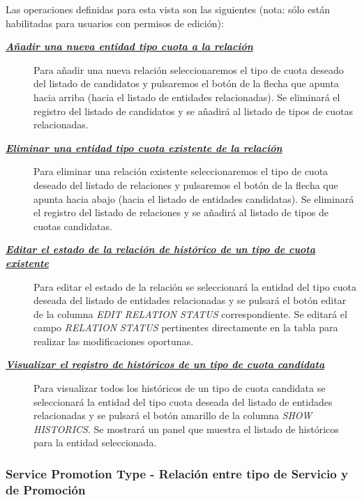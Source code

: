 Las operaciones definidas para esta vista son las siguientes (nota: sólo están habilitadas para usuarios con permisos de edición):
\begin{description}
\item[\underline{\textsl{\textbf{Añadir una nueva entidad tipo cuota a la relación}}}] Para añadir una nueva relación seleccionaremos el tipo de cuota deseado del listado de candidatos y pulsaremos el botón de la flecha que apunta hacia arriba (hacia el listado de entidades relacionadas). Se eliminará el registro del listado de candidatos y se añadirá al listado de tipos de cuotas relacionadas.

\item[\underline{\textsl{\textbf{Eliminar una entidad tipo cuota existente de la relación}}}] Para eliminar una relación existente seleccionaremos el tipo de cuota deseado del listado de relaciones y pulsaremos el botón de la flecha que apunta hacia abajo (hacia el listado de entidades candidatas). Se eliminará el registro del listado de relaciones y se añadirá al listado de tipos de cuotas candidatas.

\item[\underline{\textsl{\textbf{Editar el estado de la relación de histórico de un tipo de cuota existente}}}] Para editar el estado de la relación se seleccionará la entidad del tipo cuota deseada del listado de entidades relacionadas y se pulsará el botón editar de la columna \textit{EDIT RELATION STATUS} correspondiente. Se editará el campo \emph{RELATION STATUS}  pertinentes directamente en la tabla para realizar las modificaciones oportunas.

\item[\underline{\textsl{\textbf{Visualizar el registro de históricos de un tipo de cuota candidata}}}] Para visualizar todos los históricos de un tipo de cuota candidata se seleccionará la entidad del tipo cuota deseada del listado de entidades relacionadas y se pulsará el botón amarillo de la columna \textit{SHOW HISTORICS}. Se mostrará un panel que muestra el listado de históricos para la entidad seleccionada.
\end{description}



\subsubsection{Service Promotion Type - Relación entre tipo de Servicio y de Promoción}
\label{sub:service-promotion-type-relation}

